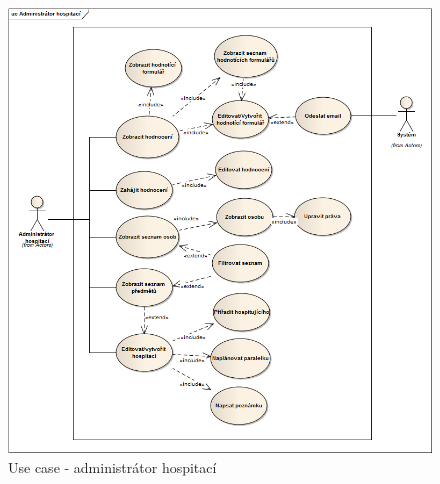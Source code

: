 \begin{figure}[H]
\begin{center}
\includegraphics[width=14cm]{figures/actor_admin}
\caption{Use case - administrátor hospitací}
\label{fig:actor_admin}
\end{center}
\end{figure}


